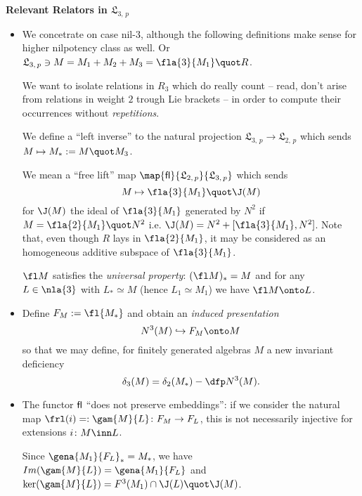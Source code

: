 \documentclass[a4paper,11pt,german,english]{report}
\newcommand{\nl}[1]{\mathfrak{L}_{#1,\,p}}
\begin{document}
\indent
{\bf Relevant Relators in $\mathfrak{L}_{3,\,p}$}
\begin{itemize}
\item[]We concetrate on case nil-$3$, although the following definitions make sense
for higher nilpotency class as well. Or $\mathfrak{L}_{3,\,p}\ni M=M_{1}+M_{2}+M_{3}=\fla{3}{M_{1}}\quot R$.


We want to isolate relations in $R_{3}$ which do really count -- read, don't arise from
relations in weight $2$ trough Lie brackets -- in order to compute their occurrences without
{\em repetitions}.

We define a ``left inverse'' to the natural
projection $\nl{3}\to\nl{2}$ which sends $M\mapsto M_{*}:=M\quot M_{3}$.

We mean a ``free lift'' map $\map{{\sf fl}}{\mathfrak{L}_{2,\,p}}{\mathfrak{L}_{3,\,p}}$ which sends
$$M\mapsto\fla{3}{M_{1}}\quot\J(M)$$ for $\J(M)$
the ideal of $\fla{3}{M_{1}}$ generated by
$N^{2}$ if $M=\fla{2}{M_{1}}\quot N^{2}$ i.{}e. $\J(M)=N^{2}+[\fla{3}{M_{1}},N^{2}]$.
Note that, even though $R$ lays in $\fla{2}{M_{1}}$, it may be
considered as an homogeneous additive subspace of $\fla{3}{M_{1}}$.

$\fl M$ satisfies the {\em universal property}: $(\fl M)_{*}=M$ and for any
$L\in\nla{3}$ with $L_{*}\simeq M$ (hence $L_{1}\simeq M_{1}$) we have
$\fl M\onto L$.

\item[]Define $F_{M}:=\fl {M_{*}}$ and obtain an
{\em induced presentation}
$$N^{3}(M)\hookrightarrow F_{M}\onto M$$
so that we may define,
for finitely generated algebras $M$ a new invariant deficiency
$$\delta_{3}(M)=\delta_{2}(M_{*})-\dfp N^{3}(M).$$


\item[]The functor ${\sf fl}$ ``does not preserve embeddings'': if we consider the natural map
$\frl(i)=:\gam{M}{L}\colon F_{M}\to F_{L}$, this is not necessarily injective
for extensions $i\colon M\inn L$.%

Since ${\gena{M_{1}}{F_{L}}}_{*}=M_{*}$, we have $Im(\gam{M}{L})=\gena{M_{1}}{F_{L}}$ and $\ker(\gam{M}{L})=F^{3}(M_{1})\cap
\J(L)\quot\J(M)$.


\end{itemize}
\end{document}
